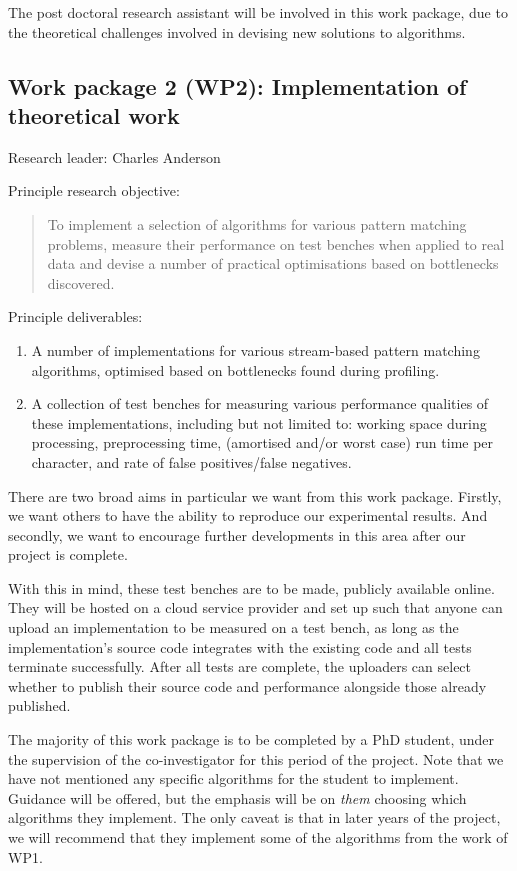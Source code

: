 \documentclass[a4paper,11pt]{article}
\begin{document}
    The post doctoral research assistant will be involved in this work package, due to the theoretical challenges involved in devising new solutions to algorithms.

    \subsection*{Work package 2 (WP2): Implementation of theoretical work}

    Research leader: Charles Anderson

    Principle research objective:
    \begin{quote}
        To implement a selection of algorithms for various pattern matching problems, measure their performance on test benches when applied to real data and devise a number of practical optimisations based on bottlenecks discovered.
    \end{quote}

    Principle deliverables:
    \begin{enumerate}
        \item A number of implementations for various stream-based pattern matching algorithms, optimised based on bottlenecks found during profiling.
        \item A collection of test benches for measuring various performance qualities of these implementations, including but not limited to: working space during processing, preprocessing time, (amortised and/or worst case) run time per character, and rate of false positives/false negatives.
    \end{enumerate}

    There are two broad aims in particular we want from this work package. Firstly, we want others to have the ability to reproduce our experimental results. And secondly, we want to encourage further developments in this area after our project is complete.

    With this in mind, these test benches are to be made, publicly available online. They will be hosted on a cloud service provider and set up such that anyone can upload an implementation to be measured on a test bench, as long as the implementation's source code integrates with the existing code and all tests terminate successfully. After all tests are complete, the uploaders can select whether to publish their source code and performance alongside those already published.

    The majority of this work package is to be completed by a PhD student, under the supervision of the co-investigator for this period of the project. Note that we have not mentioned any specific algorithms for the student to implement. Guidance will be offered, but the emphasis will be on \textit{them} choosing which algorithms they implement. The only caveat is that in later years of the project, we will recommend that they implement some of the algorithms from the work of WP1.
\end{document}
